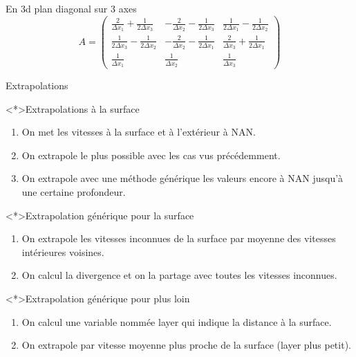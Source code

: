 \begin{frame}[shrink]{En 3d plan diagonal sur 3 axes}
\begin{equation*}
 A=\begin{pmatrix}
    \frac{2}{\Delta x_1}+\frac{1}{2\Delta x_3}&-\frac{2}{\Delta x_2}-\frac{1}{2\Delta x_3}&\frac{1}{2\Delta x_1}-\frac{1}{2\Delta x_2}\\
    \frac{1}{2\Delta x_3}-\frac{1}{2\Delta x_2}&-\frac{2}{\Delta x_2}-\frac{1}{2\Delta x_1}&\frac{2}{\Delta x_3}+\frac{1}{2\Delta x_1}\\
    \frac{1}{\Delta x_1}&\frac{1}{\Delta x_2}&\frac{1}{\Delta x_3}
   \end{pmatrix}
\end{equation*}
\end{frame}

\begin{frame}[<+->][shrink]{Extrapolations}
\begin{block}<*>{Extrapolations à la surface}

\begin{enumerate}
 \item On met les vitesses à la surface et à l'extérieur à NAN.
 \item On extrapole le plus possible avec les cas vus précédemment.
 \item On extrapole avec une méthode générique les valeurs encore à NAN jusqu'à une certaine profondeur.
\end{enumerate}

\end{block}
\begin{block}<*>{Extrapolation générique pour la surface}
\begin{enumerate}
 \item On extrapole les vitesses inconnues de la surface par moyenne des vitesses intérieures voisines.
 \item On calcul la divergence et on la partage avec toutes les vitesses inconnues.
\end{enumerate}
\end{block}

\begin{block}<*>{Extrapolation générique pour plus loin}
\begin{enumerate}
 \item On calcul une variable nommée layer qui indique la distance à la surface.
 \item On extrapole par vitesse moyenne plus proche de la surface (layer plus petit).
\end{enumerate}

 
\end{block}
 
\end{frame}

